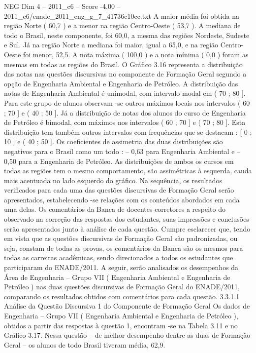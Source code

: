\begin{textsample}{NEG Dim 4 – 2011\_c6 – Score -4.00 – 2011\_c6/enade\_2011\_eng\_g\_7\_41736c10cc.txt}
A maior média foi obtida na região Norte ( 60,7 ) e a menor na região Centro-Oeste ( 53,7 ).
A mediana de todo o Brasil, neste componente, foi 60,0, a mesma das regiões Nordeste, Sudeste e Sul.
Já na região Norte a mediana foi maior, igual a 65,0, e na região Centro-Oeste foi menor, 52,5.
A nota máxima ( 100,0 ) e a nota mínima ( 0,0 ) foram as mesmas em todas as regiões do Brasil.
O Gráfico 3.16 representa a distribuição das notas nas questões discursivas no componente de Formação Geral segundo a opção de Engenharia Ambiental e Engenharia de Petróleo.
A distribuição das notas de Engenharia Ambiental é unimodal, com intervalo modal em ( 70 ; 80 ].
Para este grupo de alunos observam -se outros máximos locais nos intervalos ( 60 ; 70 ] e ( 40 ; 50 ].
Já a distribuição de notas dos alunos do curso de Engenharia de Petróleo é bimodal, com máximos nos intervalos ( 60 ; 70 ] e ( 70 ; 80 ].
Esta distribuição tem também outros intervalos com frequências que se destacam : [ 0 ; 10 ] e ( 40 ; 50 ].
Os coeficientes de assimetria das duas distribuições são negativos para o Brasil como um todo : – 0,63 para Engenharia Ambiental e – 0,50 para a Engenharia de Petróleo.
As distribuições de ambos os cursos em todas as regiões tem o mesmo comportamento, são assimétricas à esquerda, cauda mais acentuada no lado esquerdo do gráfico.
Na sequência, os resultados verificados para cada uma das questões discursivas de Formação Geral serão apresentados, estabelecendo -se relações com os conteúdos abordados em cada uma delas.
Os comentários da Banca de docentes corretores a respeito do observado na correção das respostas dos estudantes, suas impressões e conclusões serão apresentados junto à análise de cada questão.
Cumpre esclarecer que, tendo em vista que as questões discursivas de Formação Geral são padronizadas, ou seja, constam de todas as provas, os comentários da Banca são os mesmos para todas as carreiras acadêmicas, sendo direcionados a todos os estudantes que participaram do ENADE/2011.
A seguir, serão analisados os desempenhos da Área de Engenharia – Grupo VII ( Engenharia Ambiental e Engenharia de Petróleo ) nas duas questões discursivas de Formação Geral do ENADE/2011, comparando os resultados obtidos com comentários para cada questão. 3.3.1.1 Análise da Questão Discursiva 1 do Componente de Formação Geral Os dados de Engenharia – Grupo VII ( Engenharia Ambiental e Engenharia de Petróleo ), obtidos a partir das respostas à questão 1, encontram -se na Tabela 3.11 e no Gráfico 3.17.
Nessa questão – de melhor desempenho dentre as duas de Formação Geral – os alunos de todo Brasil tiveram média, 62,9.

\end{textsample}
